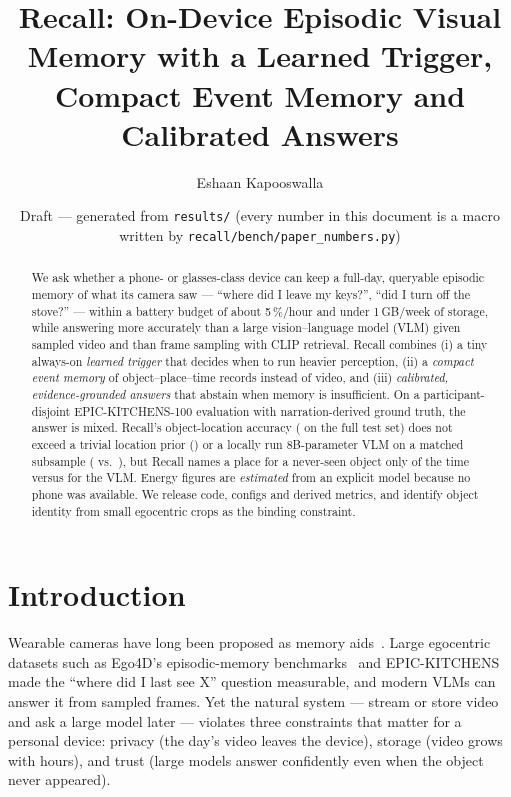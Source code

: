 \documentclass[10pt,twocolumn]{article}
\title{Recall: On-Device Episodic Visual Memory with a Learned Trigger,\\ Compact Event Memory and Calibrated Answers}
\author{Eshaan Kapooswalla}
\date{Draft --- generated from \texttt{results/} (every number in this document is a macro written by \texttt{recall/bench/paper\_numbers.py})}
\begin{document}
\maketitle

\begin{abstract}
We ask whether a phone- or glasses-class device can keep a full-day, queryable episodic memory of what its camera saw ---
``where did I leave my keys?'', ``did I turn off the stove?'' --- within a battery budget of about 5\,\%/hour and under
1\,GB/week of storage, while answering more accurately than a large vision--language model (VLM) given sampled video and
than frame sampling with CLIP retrieval. Recall combines (i) a tiny always-on \emph{learned trigger} that decides when to
run heavier perception, (ii) a \emph{compact event memory} of object--place--time records instead of video, and (iii)
\emph{calibrated, evidence-grounded answers} that abstain when memory is insufficient. On a participant-disjoint
EPIC-KITCHENS-100 evaluation with narration-derived ground truth, the answer is mixed. Recall's object-location
accuracy (\RecallLoc{} on the full test set) does not exceed a trivial location prior (\PriorLoc) or a locally run
8B-parameter VLM on a matched subsample (\BoneLoc{} vs.\ \RecallLocSub), but Recall names a place for a never-seen object
only \RecallHallSub{} of the time versus \BoneHall{} for the VLM. \TriggerAbstract{} \StorageAbstract{} \CalibAbstract{}
Energy figures are \emph{estimated} from an explicit model because no phone was available. We release code, configs and
derived metrics, and identify object identity from small egocentric crops as the binding constraint.
\end{abstract}

\section{Introduction}
Wearable cameras have long been proposed as memory aids~\citep{hodges2006sensecam}. Large egocentric datasets such as
Ego4D's episodic-memory benchmarks~\citep{grauman2022ego4d} and EPIC-KITCHENS~\citep{damen2022rescaling} made the
``where did I last see X'' question measurable, and modern VLMs can answer it from sampled frames. Yet the natural
system --- stream or store video and ask a large model later --- violates three constraints that matter for a personal
device: privacy (the day's video leaves the device), storage (video grows with hours), and trust (large models answer
confidently even when the object never appeared).
\end{document}
